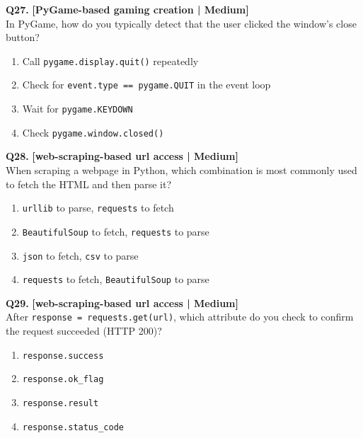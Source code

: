 \noindent\textbf{Q27.} \hfill {\small\color{LPUOrange}\textbf{[PyGame-based gaming creation | Medium]}}\\[2pt]
In PyGame, how do you typically detect that the user clicked the window's close button?

\begin{enumerate}[label=(\alph*),topsep=2pt,itemsep=1pt,partopsep=0pt,parsep=0pt]
    \item \relax Call \texttt{pygame.display.quit()} repeatedly
    \item \relax Check for \texttt{event.type == pygame.QUIT} in the event loop
    \item \relax Wait for \texttt{pygame.KEYDOWN}
    \item \relax Check \texttt{pygame.window.closed()}
\end{enumerate}
\vspace{2mm}

\noindent\textbf{Q28.} \hfill {\small\color{LPUOrange}\textbf{[web-scraping-based url access | Medium]}}\\[2pt]
When scraping a webpage in Python, which combination is most commonly used to fetch the HTML and then parse it?

\begin{enumerate}[label=(\alph*),topsep=2pt,itemsep=1pt,partopsep=0pt,parsep=0pt]
    \item \relax \texttt{urllib} to parse, \texttt{requests} to fetch
    \item \relax \texttt{BeautifulSoup} to fetch, \texttt{requests} to parse
    \item \relax \texttt{json} to fetch, \texttt{csv} to parse
    \item \relax \texttt{requests} to fetch, \texttt{BeautifulSoup} to parse
\end{enumerate}
\vspace{2mm}

\noindent\textbf{Q29.} \hfill {\small\color{LPUOrange}\textbf{[web-scraping-based url access | Medium]}}\\[2pt]
After \texttt{response = requests.get(url)}, which attribute do you check to confirm the request succeeded (HTTP 200)?

\begin{enumerate}[label=(\alph*),topsep=2pt,itemsep=1pt,partopsep=0pt,parsep=0pt]
    \item \relax \texttt{response.success}
    \item \relax \texttt{response.ok\_flag}
    \item \relax \texttt{response.result}
    \item \relax \texttt{response.status\_code}
\end{enumerate}
\vspace{2mm}

